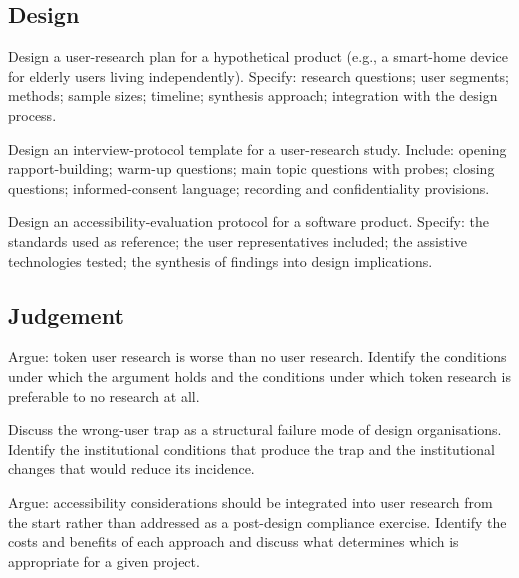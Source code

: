 \subsection*{Design}

\begin{exercise}
Design a user-research plan for a hypothetical product (e.g., a smart-home device for elderly users living independently). Specify: research questions; user segments; methods; sample sizes; timeline; synthesis approach; integration with the design process.
\end{exercise}

\begin{exercise}
Design an interview-protocol template for a user-research study. Include: opening rapport-building; warm-up questions; main topic questions with probes; closing questions; informed-consent language; recording and confidentiality provisions.
\end{exercise}

\begin{exercise}
Design an accessibility-evaluation protocol for a software product. Specify: the standards used as reference; the user representatives included; the assistive technologies tested; the synthesis of findings into design implications.
\end{exercise}

\subsection*{Judgement}

\begin{exercise}
Argue: token user research is worse than no user research. Identify the conditions under which the argument holds and the conditions under which token research is preferable to no research at all.
\end{exercise}

\begin{exercise}
Discuss the wrong-user trap as a structural failure mode of design organisations. Identify the institutional conditions that produce the trap and the institutional changes that would reduce its incidence.
\end{exercise}

\begin{exercise}
Argue: accessibility considerations should be integrated into user research from the start rather than addressed as a post-design compliance exercise. Identify the costs and benefits of each approach and discuss what determines which is appropriate for a given project.
\end{exercise}

